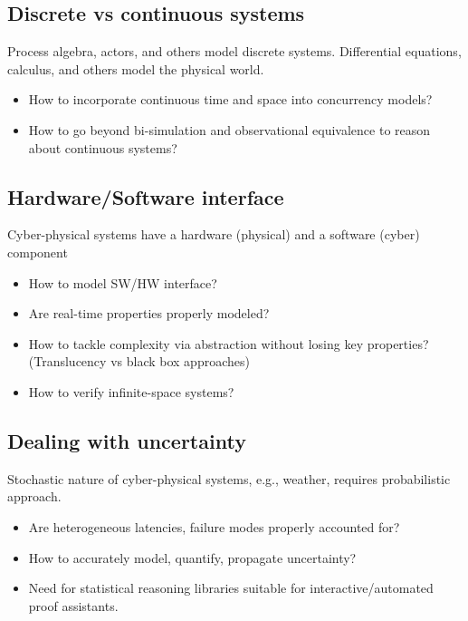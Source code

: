 \documentclass[
graybox,
envcountchap,
natbib
]{svmult}
\begin{document}
\begin{bibunit}
         \subsection{Discrete vs continuous systems}

         Process algebra, actors, and others model discrete systems.
         Differential equations, calculus, and others model the physical world.

         \begin{itemize}
         \item How to incorporate continuous time and space into concurrency models?
         \item How to go beyond bi-simulation and observational equivalence to reason about continuous systems?
         \end{itemize}
         
         \subsection{Hardware/Software interface}

         Cyber-physical systems have a hardware (physical) and a software (cyber) component
        
         \begin{itemize}
         \item How to model SW/HW interface?
         \item Are real-time properties properly modeled?
         \item  How to tackle complexity via abstraction without losing key properties?  (Translucency vs black box approaches)
         \item How to verify infinite-space systems?
         \end{itemize}

         \subsection{Dealing with uncertainty}

         Stochastic nature of cyber-physical systems, e.g., weather, requires probabilistic approach.
        
         \begin{itemize}
         \item Are heterogeneous latencies, failure modes properly accounted for?
         \item How to accurately model, quantify, propagate uncertainty?
         \item Need for statistical reasoning libraries suitable for interactive/automated proof assistants.
         \end{itemize}


\end{bibunit}
\end{document}
